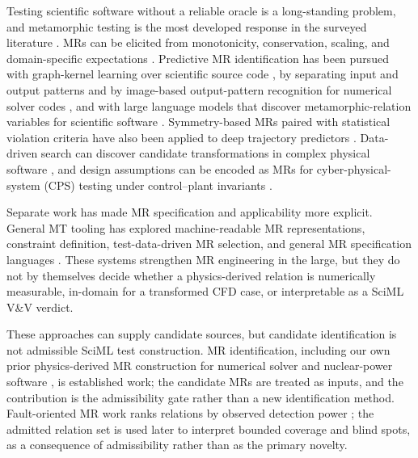 \documentclass[preprint,12pt,authoryear]{elsarticle}
\begin{document}
Testing scientific software without a reliable oracle is a long-standing problem, and metamorphic testing is the most developed response in the surveyed literature \citep{kanewalaBieman2014slr}. MRs can be elicited from monotonicity, conservation, scaling, and domain-specific expectations \citep{kanewala2019scientific,lin2020exploratory,olsen2019simulation,raunak2021continuum}. Predictive MR identification has been pursued with graph-kernel learning over scientific source code \citep{kanewala2016graphkernel}, by separating input and output patterns and by image-based output-pattern recognition for numerical solver codes \citep{wang2022mridentification,fu2021burnup}, and with large language models that discover metamorphic-relation variables for scientific software \citep{tsigkanos2023}. Symmetry-based MRs paired with statistical violation criteria have also been applied to deep trajectory predictors \citep{spieker2024trajectory,spieker2025multimodal}. Data-driven search can discover candidate transformations in complex physical software \citep{hiremath2021ocean}, and design assumptions can be encoded as MRs for cyber-physical-system (CPS) testing under control--plant invariants \citep{mandrioli2025cps}.

Separate work has made MR specification and applicability more explicit. General MT tooling has explored machine-readable MR representations, constraint definition, test-data-driven MR selection, and general MR specification languages \citep{duqueTorres2023completePipeline,duqueTorres2024selecting,sun2026ccml}. These systems strengthen MR engineering in the large, but they do not by themselves decide whether a physics-derived relation is numerically measurable, in-domain for a transformed CFD case, or interpretable as a SciML V\&V verdict.

These approaches can supply candidate sources, but candidate identification is not admissible SciML test construction. MR identification, including our own prior physics-derived MR construction for numerical solver and nuclear-power software \citep{li2022nuclearmr,wang2022mridentification}, is established work; the candidate MRs are treated as inputs, and the contribution is the admissibility gate rather than a new identification method. Fault-oriented MR work ranks relations by observed detection power \citep{srinivasan2022prioritization,saha2019faultdetection}; the admitted relation set is used later to interpret bounded coverage and blind spots, as a consequence of admissibility rather than as the primary novelty.
\end{document}

